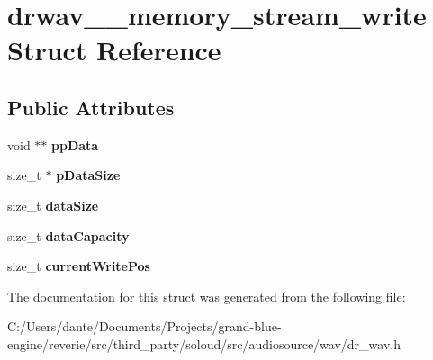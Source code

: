\hypertarget{structdrwav____memory__stream__write}{}\section{drwav\+\_\+\+\_\+memory\+\_\+stream\+\_\+write Struct Reference}
\label{structdrwav____memory__stream__write}
\subsection*{Public Attributes}
\begin{DoxyCompactItemize}
\item 
\mbox{\label{structdrwav____memory__stream__write_a52e615403f5f708d532c02c2210df110}} 
void $\ast$$\ast$ {\bfseries pp\+Data}
\item 
\mbox{\label{structdrwav____memory__stream__write_ab64d5a1522f344b5ea001d783fac8051}} 
size\+\_\+t $\ast$ {\bfseries p\+Data\+Size}
\item 
\mbox{\label{structdrwav____memory__stream__write_a9e01cbf6578e9f2b92b7ea7021078c71}} 
size\+\_\+t {\bfseries data\+Size}
\item 
\mbox{\label{structdrwav____memory__stream__write_a9101d09c995e2934734d86313659d262}} 
size\+\_\+t {\bfseries data\+Capacity}
\item 
\mbox{\label{structdrwav____memory__stream__write_ac65a0c98d3a2e7d504247c73168bd088}} 
size\+\_\+t {\bfseries current\+Write\+Pos}
\end{DoxyCompactItemize}


The documentation for this struct was generated from the following file\+:\begin{DoxyCompactItemize}
\item 
C\+:/\+Users/dante/\+Documents/\+Projects/grand-\/blue-\/engine/reverie/src/third\+\_\+party/soloud/src/audiosource/wav/dr\+\_\+wav.\+h\end{DoxyCompactItemize}
